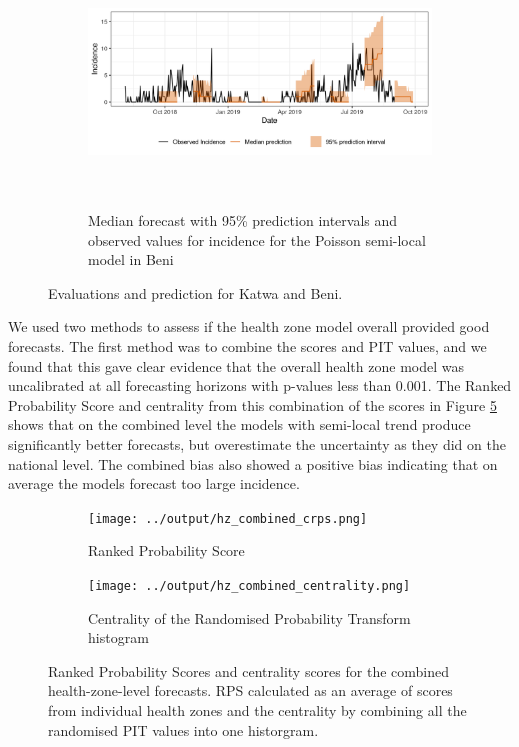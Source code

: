 \documentclass[12pt]{article}
\begin{document}
\begin{figure}[h!]
\begin{subfigure}{\textwidth} 
  \centering
  \includegraphics[width=0.9\linewidth, height=6.6cm]{../output/Beni_predictions.png}
  \caption{ Median forecast with 95\% prediction intervals and observed values for incidence for the Poisson semi-local model in Beni}
  \label{fig:beni_katwa_4}
\end{subfigure}
\caption{Evaluations and prediction for Katwa and Beni.}


\label{fig:beni_katwa}
\end{figure}

We used two methods to assess if the health zone model overall provided good forecasts. The first method was to combine the scores and PIT values, and we found that this gave clear evidence that the overall health zone model was uncalibrated at all forecasting horizons with p-values less than 0.001. The Ranked Probability Score and centrality from this combination of the scores in Figure \ref{fig:combined_hz_scores} shows that on the combined level the models with semi-local trend produce significantly better forecasts, but overestimate the uncertainty as they did on the national level. The combined bias also showed a positive bias indicating that on average the models forecast too large incidence. 

\begin{figure}[h!]
\begin{subfigure}{0.5\textwidth}
  \centering
  \texttt{[image: ../output/hz\_combined\_crps.png]}  
  \caption{Ranked Probability Score}
  \label{fig:sub-first}
\end{subfigure}
\begin{subfigure}{0.5\textwidth}
  \centering
  \texttt{[image: ../output/hz\_combined\_centrality.png]}  
  \caption{Centrality of the Randomised Probability Transform histogram}
  \label{fig:sub-second}
\end{subfigure}

  \caption{Ranked Probability Scores and centrality scores for the combined health-zone-level forecasts. RPS calculated as an average of scores from individual health zones and the centrality by combining all the randomised PIT values into one historgram.}

  \label{fig:combined_hz_scores}
\end{figure}
\end{document}
